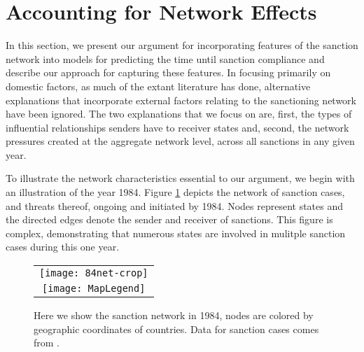 

\section*{Accounting for Network Effects}
\label{neteffects}

In this section, we present our argument for incorporating features of the sanction network into models for predicting the time until sanction compliance and describe our approach for capturing these features. In focusing primarily on domestic factors, as much of the extant literature has done, alternative explanations that incorporate external factors relating to the sanctioning network have been ignored. The two explanations that we focus on are, first, the types of influential relationships senders have to receiver states and, second, the network pressures created at the aggregate network level, across all sanctions in any given year. %

To illustrate the network characteristics essential to our argument, we begin with an illustration of the year 1984. Figure \ref{fig:spaghetti} depicts the network of sanction cases, and threats thereof, ongoing and initiated by 1984. Nodes represent states and the directed edges denote the sender and receiver of sanctions. This figure is complex, demonstrating that numerous states are involved in mulitple sanction cases during this one year.

\begin{figure}[ht]
  \centering
  \begin{tabular}{c}
	  \texttt{[image: 84net-crop]} \\
	  \texttt{[image: MapLegend]}
  \end{tabular}
  \caption{Here we show the sanction network in 1984, nodes are colored by geographic coordinates of countries. Data for sanction cases comes from \citet{morgan2009threat}.}
  \label{fig:spaghetti}
\end{figure}
\FloatBarrier

